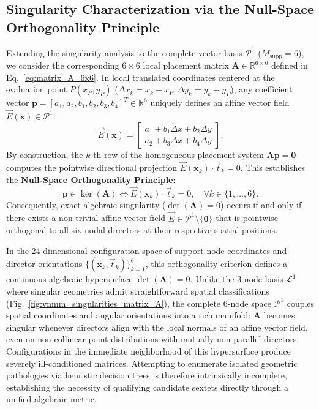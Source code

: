 \documentclass[preprint,12pt]{elsarticle}
\begin{document}
\subsection{Singularity Characterization via the Null-Space Orthogonality Principle}
\label{subsec:singularities_P1}

Extending the singularity analysis to the complete vector basis $\mathcal{P}^1$ ($M_{\mathrm{supp}} = 6$), we consider the corresponding $6 \times 6$ local placement matrix $\mathbf{A} \in \mathbb{R}^{6 \times 6}$ defined in Eq.~\eqref{eq:matrix_A_6x6}. In local translated coordinates centered at the evaluation point $P(x_P, y_P)$ ($\Delta x_k = x_k - x_P, \Delta y_k = y_k - y_P$), any coefficient vector $\mathbf{p} = [a_1, a_2, b_1, b_2, b_3, b_4]^T \in \mathbb{R}^6$ uniquely defines an affine vector field $\vec{E}(\mathbf{x}) \in \mathcal{P}^1$:
\begin{equation}
    \vec{E}(\mathbf{x}) = \begin{bmatrix} a_1 + b_1 \Delta x + b_2 \Delta y \\[2pt] a_2 + b_3 \Delta x + b_4 \Delta y \end{bmatrix}.
\end{equation}
By construction, the $k$-th row of the homogeneous placement system $\mathbf{A}\mathbf{p} = \mathbf{0}$ computes the pointwise directional projection $\vec{E}(\mathbf{x}_k) \cdot \vec{t}_k = 0$. This establishes the \textbf{Null-Space Orthogonality Principle}:
\begin{equation}
    \mathbf{p} \in \ker(\mathbf{A}) \iff \vec{E}(\mathbf{x}_k) \cdot \vec{t}_k = 0, \quad \forall k \in \{1, \dots, 6\}.
    \label{eq:null_space_orthogonality}
\end{equation}
Consequently, exact algebraic singularity ($\det(\mathbf{A}) = 0$) occurs if and only if there exists a non-trivial affine vector field $\vec{E} \in \mathcal{P}^1 \setminus \{\mathbf{0}\}$ that is pointwise orthogonal to all six nodal directors at their respective spatial positions.

In the 24-dimensional configuration space of support node coordinates and director orientations $\{(\mathbf{x}_k, \vec{t}_k)\}_{k=1}^6$, this orthogonality criterion defines a continuous algebraic hypersurface $\det(\mathbf{A}) = 0$. Unlike the 3-node basis $\mathcal{L}^1$ where singular geometries admit straightforward spatial classifications (Fig.~\ref{fig:vnmm_singularities_matrix_A}), the complete 6-node space $\mathcal{P}^1$ couples spatial coordinates and angular orientations into a rich manifold: $\mathbf{A}$ becomes singular whenever directors align with the local normals of an affine vector field, even on non-collinear point distributions with mutually non-parallel directors. Configurations in the immediate neighborhood of this hypersurface produce severely ill-conditioned matrices. Attempting to enumerate isolated geometric pathologies via heuristic decision trees is therefore intrinsically incomplete, establishing the necessity of qualifying candidate sextets directly through a unified algebraic metric.
\end{document}
